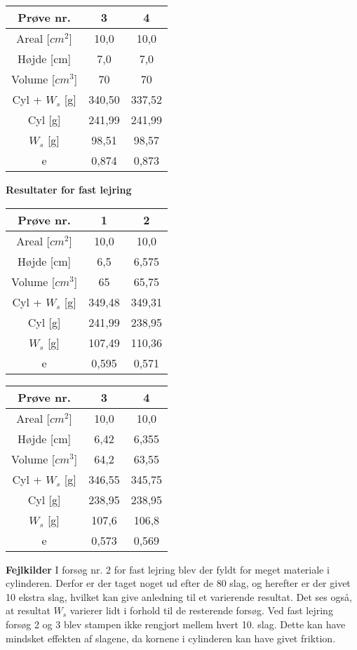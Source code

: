 \begin{center}
	\begin{tabular}{ |c|c|c| } 
		\hline
		Prøve nr. & 3 & 4 \\	\hline
		Areal [$cm^2$] & 10,0 & 10,0 \\ \hline
		Højde [cm] & 7,0 & 7,0 \\ \hline
		Volume [$cm^3$] & 70 & 70 \\ \hline
		Cyl + $W_s$ [g] & 340,50 & 337,52 \\ \hline
		Cyl [g] & 241,99 & 241,99 \\ \hline
		$W_s$ [g] & 98,51 & 98,57 \\ \hline
		e & 0,874 & 0,873\\ \hline
	\end{tabular}
\end{center}

\textbf{Resultater for fast lejring}
\begin{center}
	\begin{tabular}{ |c|c|c| } 
		\hline
		Prøve nr. & 1 & 2 \\	\hline 
		Areal [$cm^2$] & 10,0 & 10,0 \\ \hline
		Højde [cm] & 6,5 & 6,575 \\ \hline
		Volume [$cm^3$] & 65 & 65,75 \\ \hline
		Cyl + $W_s$ [g] & 349,48 & 349,31 \\ \hline
		Cyl [g] & 241,99 & 238,95 \\ \hline
		$W_s$ [g] & 107,49 & 110,36 \\ \hline
		e & 0,595 & 0,571 \\ \hline
	\end{tabular}
\end{center}

\begin{center}
	\begin{tabular}{ |c|c|c| } 
		\hline
		Prøve nr. & 3 & 4 \\	\hline
		Areal [$cm^2$] & 10,0 & 10,0 \\ \hline
		Højde [cm] & 6,42 & 6,355 \\ \hline
		Volume [$cm^3$] & 64,2 & 63,55 \\ \hline
		Cyl + $W_s$ [g] & 346,55 & 345,75 \\ \hline
		Cyl [g] & 238,95 & 238,95 \\ \hline
		$W_s$ [g] & 107,6 & 106,8 \\ \hline
		e & 0,573 & 0,569 \\ \hline
	\end{tabular}
\end{center}

\textbf{Fejlkilder}
\newline
I forsøg nr. 2 for fast lejring blev der fyldt for meget materiale i cylinderen. Derfor er der taget noget ud efter de 80 slag, og herefter er der givet 10 ekstra slag, hvilket kan give anledning til et varierende resultat. Det ses også, at resultat $W_s$ varierer lidt i forhold til de resterende forsøg.
\newline \indent{     }  Ved fast lejring forsøg 2 og 3 blev stampen ikke rengjort mellem hvert 10. slag. Dette kan have mindsket effekten af slagene, da kornene i cylinderen kan have givet friktion.